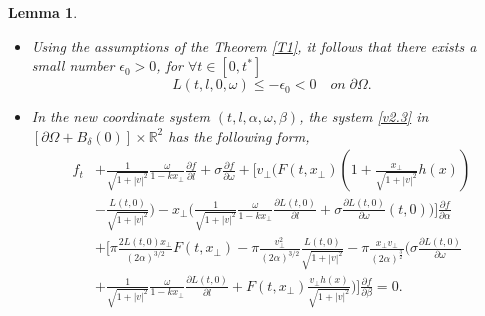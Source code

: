 \documentclass[11pt,reqno]{amsart}%
\newtheorem{Lemma}{Lemma}[section]
\theoremstyle{definition}
\theoremstyle{remark}
\begin{document}
\begin{Lemma}\label{L1}
\begin{itemize}
  \item [(1)] Using the assumptions of the Theorem \ref{T1}, it follows that there exists a small number $\epsilon_{0}>0$, for $\forall t \in [0,t^{*}]$
  $$L(t,l,0,\omega)\leq -\epsilon_{0}< 0\quad on \;\partial\Omega.$$
  \item [(2)] In the new coordinate system $(t,l,\alpha,\omega,\beta)$, the system \eqref{v2.3} in $[\partial\Omega +B_{\delta}(0)]\times\mathbb{R}^{2}$ has the following form,
  \begin{align}
  f_{t}&+\frac{1}{\sqrt{1+|v|^{2}}}\frac{\omega}{1-kx_{\bot}}\frac{\partial f}{\partial l}+\sigma \frac{\partial f}{\partial \omega}
  +\Big[v_{\bot}\Big(F(t,x_{\bot})(1+\frac{x_{\bot}}{\sqrt{1+|v|^{2}}}h(x))\nonumber\\
  &-\frac{L(t,0)}{\sqrt{1+|v|^{2}}}\Big)
  -x_{\bot}\Big(\frac{1}{\sqrt{1+|v|^{2}}}\frac{\omega}{1-kx_{\bot}}\frac{\partial L(t,0)}{\partial l}+\sigma \frac{\partial L(t,0)}{\partial \omega}(t,0)\Big)\Big]\frac{\partial f}{\partial\alpha}\nonumber\\
  &+\Big[\pi \frac{2L(t,0)x_{\bot}}{(2\alpha)^{3/2}}F(t,x_{\bot})-\pi\frac{v^{2}_{\bot}}{(2\alpha)^{3/2}}\frac{L(t,0)}{\sqrt{1+|v|^{2}}}-\pi \frac{x_{\bot}v_{\bot}}{(2\alpha)^{\frac{3}{2}}}\Big(\sigma \frac{\partial L(t,0)}{\partial\omega}\nonumber\\
  &+ \frac{1}{\sqrt{1+|v|^{2}}}\frac{\omega}{1-k x_{\bot}}\frac{\partial L(t,0)}{\partial l}+F(t,x_{\bot})\frac{v_{\bot}h(x)}{\sqrt{1+|v|^{2}}}\Big)\Big]\frac{\partial f}{\partial\beta}=0. \label{v4.9}
  \end{align}
\end{itemize}
\end{Lemma}
\end{document}

